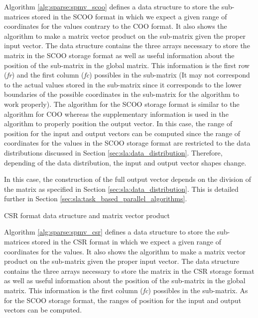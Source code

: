 Algorithm \ref{alg:sparse:spmv_scoo} defines a data structure to store the sub-matrices stored in the SCOO format in which we expect a given range of coordinates for the values contrary to the COO format.
It also shows the algorithm to make a matrix vector product on the sub-matrix given the proper input vector.
The data structure contains the three arrays necessary to store the matrix in the SCOO storage format as well as useful information about the position of the sub-matrix in the global matrix.
This information is the first row (\textit{fr}) and the first column (\textit{fc}) possibles in the sub-matrix (It may not correspond to the actual values stored in the sub-matrix since it corresponds to the lower boundaries of the possible coordinates in the sub-matrix for the algorithm to work properly).
The algorithm for the SCOO storage format is similar to the algorithm for COO whereas the supplementary information is used in the algorithm to properly position the output vector.
In this case, the range of position for the input and output vectors can be computed since the range of coordinates for the values in the SCOO storage format are restricted to the data distributions discussed in Section \ref{sec:sla:data_distribution}.
Therefore, depending of the data distribution, the input and output vector shapes change.

In this case, the construction of the full output vector depends on the division of the matrix as specified in Section \ref{sec:sla:data_distribution}.
This is detailed further in Section \ref{sec:sla:task_based_parallel_algorithms}.


\begin{algorithm}[h]
	\DontPrintSemicolon
	\SetAlgoVlined
	\caption{CSR format data structure and matrix vector product\label{alg:sparse:spmv_csr}}

	\;
\end{algorithm}

Algorithm \ref{alg:sparse:spmv_csr} defines a data structure to store the sub-matrices stored in the CSR format in which we expect a given range of coordinates for the values.
It also shows the algorithm to make a matrix vector product on the sub-matrix given the proper input vector.
The data structure contains the three arrays necessary to store the matrix in the CSR storage format as well as useful information about the position of the sub-matrix in the global matrix.
This information is the first column (\textit{fc}) possibles in the sub-matrix.
As for the SCOO storage format, the ranges of position for the input and output vectors can be computed.


